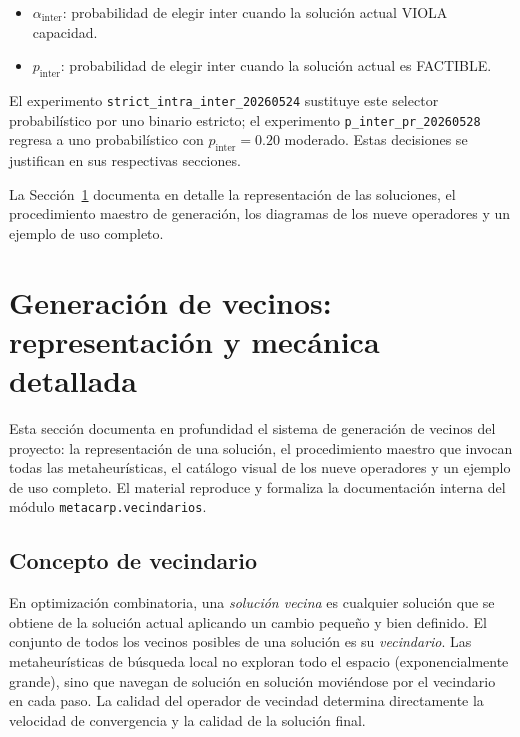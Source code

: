 \documentclass[11pt,a4paper]{article}
\theoremstyle{definition}
\theoremstyle{remark}
\begin{document}
\begin{itemize}
\item $\alpha_{\text{inter}}$: probabilidad de elegir inter cuando la
  solución actual VIOLA capacidad.
\item $p_{\text{inter}}$: probabilidad de elegir inter cuando la
  solución actual es FACTIBLE.
\end{itemize}

El experimento \texttt{strict\_intra\_inter\_20260524} sustituye este
selector probabilístico por uno binario estricto; el experimento
\texttt{p\_inter\_pr\_20260528} regresa a uno probabilístico con
$p_{\text{inter}} = 0.20$ moderado. Estas decisiones se justifican en
sus respectivas secciones.

La Sección~\ref{sec:generacion-vecinos} documenta en detalle la representación de las soluciones, el procedimiento maestro de generación, los diagramas de los nueve operadores y un ejemplo de uso completo.

\section{Generación de vecinos: representación y mecánica detallada}
\label{sec:generacion-vecinos}

Esta sección documenta en profundidad el sistema de generación de vecinos
del proyecto: la representación de una solución, el procedimiento maestro
que invocan todas las metaheurísticas, el catálogo visual de los nueve
operadores y un ejemplo de uso completo. El material reproduce y formaliza
la documentación interna del módulo \texttt{metacarp.vecindarios}.

\subsection{Concepto de vecindario}

En optimización combinatoria, una \emph{solución vecina} es cualquier
solución que se obtiene de la solución actual aplicando un cambio pequeño
y bien definido. El conjunto de todos los vecinos posibles de una solución
es su \emph{vecindario}. Las metaheurísticas de búsqueda local no exploran
todo el espacio (exponencialmente grande), sino que navegan de solución en
solución moviéndose por el vecindario en cada paso. La calidad del operador
de vecindad determina directamente la velocidad de convergencia y la
calidad de la solución final.
\end{document}
